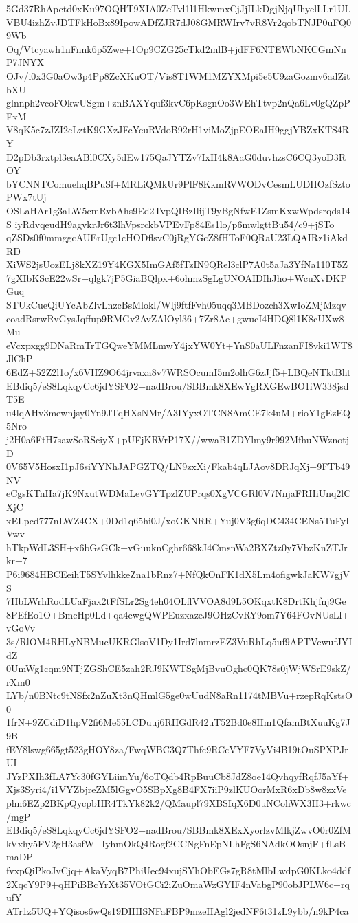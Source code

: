 5Gd37RhApctd0xKu97OQHT9XIA0ZeTvl1l1HkwmxCjJjILkDgjNjqUhyelLLr1UL
VBU4izhZvJDTFkHoBx89IpowADfZJR7dJ08GMRWIrv7vR8Vr2qobTNJP0uFQ09Wb
Oq/Vtcyawh1nFnnk6p5Zwe+1Op9CZG25cTkd2mlB+jdFF6NTEWbNKCGmNnP7JNYX
OJv/i0x3G0aOw3p4Pp8ZcXKuOT/Vis8T1WM1MZYXMpi5e5U9zaGozmv6adZitbXU
glnnph2vcoFOkwUSgm+znBAXYquf3kvC6pKsgnOo3WEhTtvp2nQa6Lv0gQZpPFxM
V8qK5c7zJZI2cLztK9GXzJFcYcuRVdoB92rH1viMoZjpEOEaIH9ggjYBZxKTS4RY
D2pDb3rxtpl3eaABl0CXy5dEw175QaJYTZv7IxH4k8AaG0duvhzsC6CQ3yoD3ROY
bYCNNTComuehqBPuSf+MRLiQMkUr9PlF8KkmRVWODvCesmLUDHOzfSztoPWx7tUj
OSLaHAr1g3aLW5cmRvbAhs9Ed2TvpQIBzIlijT9yBgNfwE1ZsmKxwWpdsrqds14S
iyRdvqeudH9agvkrJr6t3lhVpsrckbVPEvFp84Es1lo/p6mwlgttBu54/c9+jSTo
qZSDs0f0mmggcAUErUgc1cHODflsvC0jRgYGcZ8fHToF0QRaU23LQAIRz1iAkdRD
XiWS2jsUozELj8kXZ19Y4KGX5ImGAf5fTzIN9QRel3clP7A0t5aJa3YfNa110T5Z
7gXIbKScE22wSr+qlgk7jP5GiaBQlpx+6ohmzSgLgUNOAIDIhJho+WcuXvDKPGuq
STUkCueQiUYcAbZlvLnzcBsMlokl/Wlj9ftfFvh05uqq3MBDozch3XwIoZMjMzqv
coadRsrwRvGysJqffup9RMGv2AvZAlOyl36+7Zr8Ae+gwucI4HDQ8l1K8cUXw8Mu
eVcxpxgg9DNaRmTrTGQweYMMLmwY4jxYW0Yt+YnS0aULFnzanFI8vki1WT8JlChP
6EdZ+52Z2l1o/x6VHZ9O64jrvaxa8v7WRSOcumI5m2olhG6zJjf5+LBQeNTktBht
EBdiq5/eS8LqkqyCc6jdYSFO2+nadBrou/SBBmk8XEwYgRXGEwBO1iW338jsdT5E
u4lqAHv3mewnjsy0Yn9JTqHXsNMr/A3IYyxOTCN8AmCE7k4uM+rioY1gEzEQ5Nro
j2H0a6FtH7sawSoRSciyX+pUFjKRVrP17X//wwaB1ZDYlmy9r992MfhuNWznotjD
0V65V5HosxI1pJ6siYYNhJAPGZTQ/LN9zxXi/Fkab4qLJAov8DRJqXj+9FTb49NV
eCgsKTnHa7jK9NxutWDMaLevGYTpzlZUPrqs0XgVCGRl0V7NnjaFRHiUnq2lCXjC
xELpcd777nLWZ4CX+0Dd1q65hi0J/xoGKNRR+Yuj0V3g6qDC434CENs5TuFyIVwv
hTkpWdL3SH+x6bGsGCk+vGuuknCghr668kJ4CmsnWa2BXZtz0y7VbzKnZTJrkr+7
P6i9684HBCEeihT5SYvlhkkeZna1bRnz7+NfQkOnFK1dX5Lm4ofigwkJaKW7gjVS
7HbLWrhRodLUaFjax2tFfSLr2Sg4eh04OLflVVOA8d9L5OKqxtK8DrtKhjfnj9Ge
8PEfEo1O+BmcHp0Ld+qa4cwgQWPEuzxazeJ9OHzCvRY9om7Y64FOvNUsLl+vGoVv
3s/RlOM4RHLyNBMucUKRGlsoV1Dy1Ird7lnmrzEZ3VuRhLq5uf9APTVcwufJYIdZ
0UmWg1cqm9NTjZGShCE5zah2RJ9KWTSgMjBvuOghc0QK78s0jWjWSrE9skZ/rXm0
LYb/n0BNtc9tNSfx2nZuXt3nQHmlG5ge0wUudN8aRn1174tMBVu+rzepRqKstsO0
1frN+9ZCdiD1hpV2fi6Me55LCDuuj6RHGdR42uT52Bd0e8Hm1QfamBtXuuKg7J9B
fEY8lswg665gt523gHOY8za/FwqWBC3Q7Thfc9RCcVYF7VyVi4B19tOuSPXPJrUI
JYzPXIh3fLA7Yc30fGYLiimYu/6oTQdb4RpBuuCb8JdZ8oe14QvhqyfRqfJ5aYf+
Xjs3Syri4/i1VYZbjreZM5lGgvO5SBpXg8B4FX7iiP9zlKUOorMxR6xDb8w8zxVe
phn6EZp2BKpQycpbHR4TkYk82k2/QMaupl79XBSIqX6D0uNCohWX3H3+rkwc/mgP
EBdiq5/eS8LqkqyCc6jdYSFO2+nadBrou/SBBmk8XExXyorlzvMlkjZwvO0r0ZfM
kVxhy5FV2gH3asfW+IyhmOkQ4Rogf2CCNgFnEpNLhFgS6NAdkOOsnjF+fLsBmaDP
fvxpQiPkoJvCjq+AkaVyqB7PhiUec94xujSYhObEGs7gR8tMlbLwdpG0KLko4ddf
2XqcY9P9+qHPiBBcYrXt35VOtGCi2iZuOmaWzGYIF4nVabgP90obJPLW6c+rqufY
ATr1z5UQ+YQisos6wQs19DIHISNFaFBP9mzeHAgl2jedNF6t31zL9ybb/n9kP4ca
